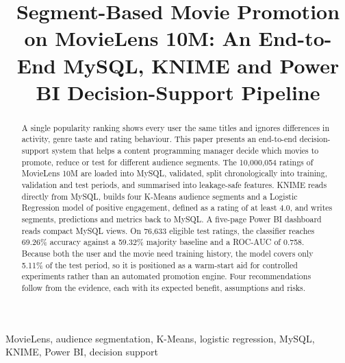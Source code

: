 \documentclass[conference]{IEEEtran}
\newcommand{\vn}[1]{{\fontencoding{T5}\selectfont #1}}
\begin{document}
\title{Segment-Based Movie Promotion on MovieLens 10M: An End-to-End MySQL, KNIME and Power BI Decision-Support Pipeline}

\author{\IEEEauthorblockN{\vn{Hồ Anh Tuấn}}
\and
\IEEEauthorblockN{\vn{Trần Ngọc Quân}}
}

\maketitle

\begin{abstract}
A single popularity ranking shows every user the same titles and ignores differences in activity, genre taste and rating behaviour. This paper presents an end-to-end decision-support system that helps a content programming manager decide which movies to promote, reduce or test for different audience segments. The 10,000,054 ratings of MovieLens 10M are loaded into MySQL, validated, split chronologically into training, validation and test periods, and summarised into leakage-safe features. KNIME reads directly from MySQL, builds four K-Means audience segments and a Logistic Regression model of positive engagement, defined as a rating of at least 4.0, and writes segments, predictions and metrics back to MySQL. A five-page Power BI dashboard reads compact MySQL views. On 76,633 eligible test ratings, the classifier reaches 69.26\% accuracy against a 59.32\% majority baseline and a ROC-AUC of 0.758. Because both the user and the movie need training history, the model covers only 5.11\% of the test period, so it is positioned as a warm-start aid for controlled experiments rather than an automated promotion engine. Four recommendations follow from the evidence, each with its expected benefit, assumptions and risks.
\end{abstract}

\begin{IEEEkeywords}
MovieLens, audience segmentation, K-Means, logistic regression, MySQL, KNIME, Power BI, decision support
\end{IEEEkeywords}
\end{document}
